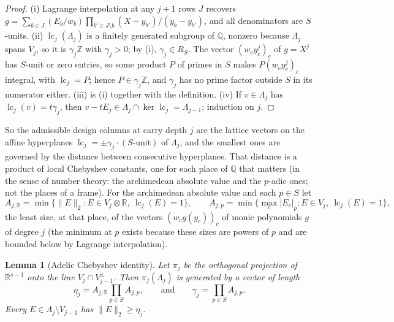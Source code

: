 \documentclass[11pt]{amsart}
\newtheorem{lemma}[theorem]{Lemma}
\theoremstyle{definition}
\theoremstyle{plain}
\newcommand{\Z}{\mathbb{Z}}
\providecommand{\R}{\mathbb{R}}
\begin{document}
\begin{proof}
(i) Lagrange interpolation at any $j+1$ rows $J$ recovers $g=\sum_{b\in J}(E_b/w_b)\prod_{b'\in J\setminus b}(X-y_{b'})/(y_b-y_{b'})$, and all denominators are $S$-units. (ii) $\operatorname{lc}_j(\Lambda_j)$ is a finitely generated subgroup of $\mathbb Q$, nonzero because $\Lambda_j$ spans $V_j$, so it is $\gamma_j\Z$ with $\gamma_j>0$; by (i), $\gamma_j\in R_S$. The vector $(w_cy_c^j)_c$ of $g=X^j$ has $S$-unit or zero entries, so some product $P$ of primes in $S$ makes $P(w_cy_c^j)_c$ integral, with $\operatorname{lc}_j=P$; hence $P\in\gamma_j\Z$, and $\gamma_j$ has no prime factor outside $S$ in its numerator either. (iii) is (i) together with the definition. (iv) If $v\in\Lambda_j$ has $\operatorname{lc}_j(v)=t\gamma_j$, then $v-tE_j\in\Lambda_j\cap\ker\operatorname{lc}_j=\Lambda_{j-1}$; induction on $j$.
\end{proof}

So the admissible design columns at carry depth $j$ are the lattice vectors on the affine hyperplanes $\operatorname{lc}_j=\pm\gamma_j\cdot(S\text{-unit})$ of $\Lambda_j$, and the smallest ones are governed by the distance between consecutive hyperplanes. That distance is a product of local Chebyshev constants, one for each place of $\mathbb Q$ that matters (in the sense of number theory: the archimedean absolute value and the $p$-adic ones; not the places of a frame). For the archimedean absolute value and each $p\in S$ let
\[
A_{j,\R}=\min\bigl\{\|E\|_2:E\in V_j\otimes\R,\ \operatorname{lc}_j(E)=1\bigr\},\qquad A_{j,p}=\min\bigl\{\max_c|E_c|_p:E\in V_j,\ \operatorname{lc}_j(E)=1\bigr\},
\]
the least size, at that place, of the vectors $(w_cg(y_c))_c$ of monic polynomials $g$ of degree $j$ (the minimum at $p$ exists because these sizes are powers of $p$ and are bounded below by Lagrange interpolation).

\begin{lemma}[Adelic Chebyshev identity]\label{lem:adelic}
Let $\pi_j$ be the orthogonal projection of $\R^{s-1}$ onto the line $V_j\cap V_{j-1}^\perp$. Then $\pi_j(\Lambda_j)$ is generated by a vector of length
\[
\eta_j=A_{j,\R}\prod_{p\in S}A_{j,p},\qquad\text{and}\qquad \gamma_j=\prod_{p\in S}A_{j,p}.
\]
Every $E\in\Lambda_j\setminus V_{j-1}$ has $\|E\|_2\ge \eta_j$.
\end{lemma}
\end{document}
